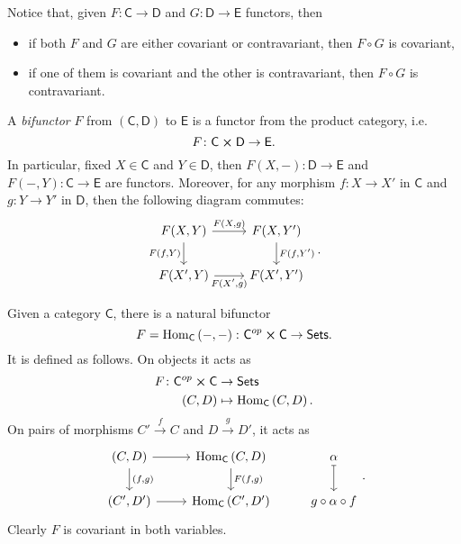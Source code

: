 \begin{rem}
	Notice that, given $F\colon \mathsf{C} \to \mathsf{D}$ and $G\colon \mathsf{D} \to \mathsf{E}$ functors, then
	\begin{itemize}
		\item if both $F$ and $G$ are either covariant or contravariant, then $F \circ G$ is covariant,
		\item if one of them is covariant and the other is contravariant, then $F \circ G$ is contravariant.
	\end{itemize}
\end{rem}

\begin{defn}[Bifunctor]
	A {\em bifunctor} $F$ from $\left(\mathsf{C}, \mathsf{D}\right)$ to $\mathsf{E}$ is a functor from the product category, i.e.
	\begin{equation}
	F\colon \mathsf{C}\cross \mathsf{D} \to \mathsf{E} 
	.\end{equation}
	In particular, fixed $X \in \mathsf{C}$ and $Y \in \mathsf{D}$,
	then $F \left(X, - \right)\colon \mathsf{D} \to \mathsf{E}$ and
	$F \left( - , Y \right)\colon \mathsf{C} \to \mathsf{E}$ are functors.
	Moreover, for any morphism $f\colon X \to X'$ in $\mathsf{C}$ and
	$g\colon Y \to Y'$ in $\mathsf{D}$, then the following diagram commutes:
	\begin{equation}
	\begin{tikzcd}
		F(X,Y) \arrow[r, "{F(X,g)}", rightarrow]\arrow[d, "{F(f,Y)}"', rightarrow] & F(X,Y')\arrow[d, "{F(f,Y')}", rightarrow] \\
		F(X',Y) \arrow[r, "{F(X',g)}"', rightarrow] & F(X',Y')
	\end{tikzcd}
	.\end{equation} 
\end{defn}

\begin{ex}
	Given a category $\mathsf{C}$, there is a natural bifunctor
	\begin{equation}
	F = \mathrm{Hom}_{\mathsf{C}} \left( -, - \right)\colon \mathsf{C}^{op} \cross \mathsf{C} \to \mathsf{Sets}
	.\end{equation} 
	It is defined as follows.
	On objects it acts as
	\begin{align}
		F\colon \mathsf{C}^{op} \cross \mathsf{C} &\to \mathsf{Sets} \\
		\left(C, D\right) &\mapsto \mathrm{Hom}_{\mathsf{C}} \left( C, D \right)
	.\end{align} 
	On pairs of morphisms $C' \xrightarrow{f} C$ and $D \xrightarrow{g} D'$, it acts as
	\begin{equation}
	\begin{tikzcd}
		\left(C, D\right) \arrow[r, "", rightarrow] \arrow[d, "{(f,g)}", rightarrow] &
		\mathrm{Hom}_{\mathsf{C}} \left( C, D \right) \arrow[d, "{F(f,g)}", rightarrow] &
		\alpha \arrow[d, "", mapsto]\\
		\left(C', D'\right) \arrow[r, "", rightarrow] &
		\mathrm{Hom}_{\mathsf{C}} \left( C', D' \right) &
		g \circ \alpha \circ f
	\end{tikzcd}
	.\end{equation} 
	Clearly $F$ is covariant in both variables.
\end{ex} 	

